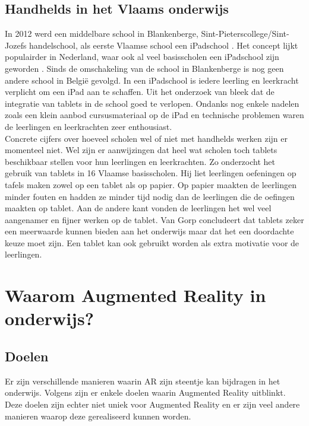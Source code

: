 \documentclass[pdftex,a4paper,12pt,twoside]{report}
\begin{document}
  \subsection{Handhelds in het Vlaams onderwijs}
	
	In 2012 werd een middelbare school in Blankenberge, Sint-Pieterscollege/Sint-Jozefs handelschool, als eerste Vlaamse school een iPadschool \citep{bettina}. Het concept lijkt populairder in Nederland, waar ook al veel basisscholen een iPadschool zijn geworden \citep{ipadschool}. Sinds de omschakeling van de school in Blankenberge is nog geen andere school in Belgi\"e gevolgd. In een iPadschool is iedere leerling en leerkracht verplicht om een iPad aan te schaffen. Uit het onderzoek van \cite{bettina} bleek dat de integratie van tablets in de school goed te verlopen. Ondanks nog enkele nadelen zoals een klein aanbod cursusmateriaal op de iPad en technische problemen waren de leerlingen en leerkrachten zeer enthousiast. \\
	
	Concrete cijfers over hoeveel scholen wel of niet met handhelds werken zijn er momenteel niet. Wel zijn er aanwijzingen dat heel wat scholen toch tablets beschikbaar stellen voor hun leerlingen en leerkrachten. Zo onderzocht \cite{tabletsOnderwijs} het gebruik van tablets in 16 Vlaamse basisscholen. Hij liet leerlingen oefeningen op tafels maken zowel op een tablet als op papier. Op papier maakten de leerlingen minder fouten en hadden ze minder tijd nodig dan de leerlingen die de oefingen maakten op tablet. Aan de andere kant vonden de leerlingen het wel veel aangenamer en fijner werken op de tablet. Van Gorp concludeert dat tablets zeker een meerwaarde kunnen bieden aan het onderwijs maar dat het een doordachte keuze moet zijn. Een tablet kan ook gebruikt worden als extra motivatie voor de leerlingen. 
	
	

	
\section{Waarom Augmented Reality in onderwijs?}


\subsection{Doelen}
\label{sec:doelen}

Er zijn verschillende manieren waarin AR zijn steentje kan bijdragen in het onderwijs.  Volgens \cite{aredu} zijn er enkele doelen waarin Augmented Reality uitblinkt. Deze doelen zijn echter niet uniek voor Augmented Reality en er zijn veel andere manieren waarop deze gerealiseerd kunnen worden. 
\end{document}
